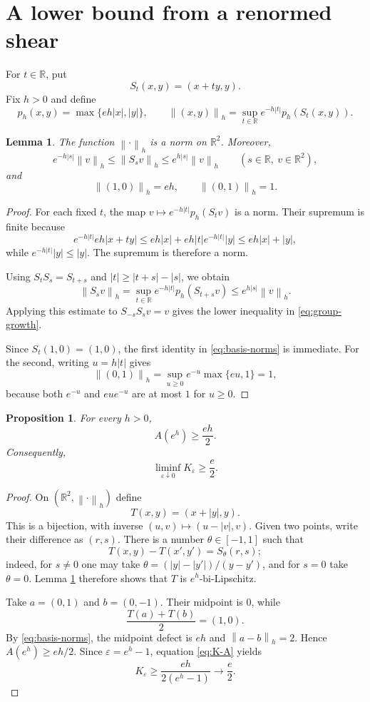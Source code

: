 \documentclass[11pt]{article}
\newtheorem{proposition}[theorem]{Proposition}
\newtheorem{lemma}[theorem]{Lemma}
\theoremstyle{remark}
\newcommand{\R}{\mathbb{R}}
\newcommand{\eps}{\varepsilon}
\newcommand{\norm}[1]{\left\lVert #1\right\rVert}
\begin{document}
\section{A lower bound from a renormed shear}

For $t\in\R$, put
\[
 S_t(x,y)=(x+ty,y).
\]
Fix $h>0$ and define
\[
 p_h(x,y)=\max\{eh|x|,|y|\},
 \qquad
 \norm{(x,y)}_h=\sup_{t\in\R}e^{-h|t|}p_h(S_t(x,y)).
\]

\begin{lemma}\label{lem:shear-norm}
The function $\norm{\cdot}_h$ is a norm on $\R^2$.  Moreover,
\begin{equation}\label{eq:group-growth}
 e^{-h|s|}\norm{v}_h\le \norm{S_s v}_h
 \le e^{h|s|}\norm{v}_h
 \qquad(s\in\R,\ v\in\R^2),
\end{equation}
and
\begin{equation}\label{eq:basis-norms}
 \norm{(1,0)}_h=eh,
 \qquad
 \norm{(0,1)}_h=1.
\end{equation}
\end{lemma}

\begin{proof}
For each fixed $t$, the map $v\mapsto e^{-h|t|}p_h(S_t v)$ is a norm.
Their supremum is finite because
\[
 e^{-h|t|}eh|x+ty|
 \le eh|x|+eh|t|e^{-h|t|}|y|
 \le eh|x|+|y|,
\]
while $e^{-h|t|}|y|\le|y|$.  The supremum is therefore a norm.

Using $S_tS_s=S_{t+s}$ and $|t|\ge |t+s|-|s|$, we obtain
\[
 \norm{S_s v}_h
 =\sup_{t\in\R}e^{-h|t|}p_h(S_{t+s}v)
 \le e^{h|s|}\norm{v}_h.
\]
Applying this estimate to $S_{-s}S_s v=v$ gives the lower inequality in
\eqref{eq:group-growth}.

Since $S_t(1,0)=(1,0)$, the first identity in \eqref{eq:basis-norms} is
immediate.  For the second, writing $u=h|t|$ gives
\[
 \norm{(0,1)}_h
 =\sup_{u\ge0}e^{-u}\max\{eu,1\}=1,
\]
because both $e^{-u}$ and $eu e^{-u}$ are at most $1$ for $u\ge0$.
\end{proof}

\begin{proposition}\label{prop:lower}
For every $h>0$,
\[
 A(e^h)\ge \frac{eh}{2}.
\]
Consequently,
\[
 \liminf_{\eps\downarrow0}K_{\eps}\ge \frac e2.
\]
\end{proposition}

\begin{proof}
On $(\R^2,\norm{\cdot}_h)$ define
\[
 T(x,y)=(x+|y|,y).
\]
This is a bijection, with inverse $(u,v)\mapsto(u-|v|,v)$.  Given two
points, write their difference as $(r,s)$.  There is a number
$\theta\in[-1,1]$ such that
\[
 T(x,y)-T(x',y')=S_\theta(r,s);
\]
indeed, for $s\ne0$ one may take
$\theta=(|y|-|y'|)/(y-y')$, and for $s=0$ take $\theta=0$.
Lemma \ref{lem:shear-norm} therefore shows that $T$ is
$e^h$-bi-Lipschitz.

Take $a=(0,1)$ and $b=(0,-1)$.  Their midpoint is $0$, while
\[
 \frac{T(a)+T(b)}2=(1,0).
\]
By \eqref{eq:basis-norms}, the midpoint defect is $eh$ and
$\norm{a-b}_h=2$.  Hence $A(e^h)\ge eh/2$.  Since
$\eps=e^h-1$, equation \eqref{eq:K-A} yields
\[
 K_{\eps}\ge \frac{eh}{2(e^h-1)}\longrightarrow\frac e2.
\]
\end{proof}
\end{document}
